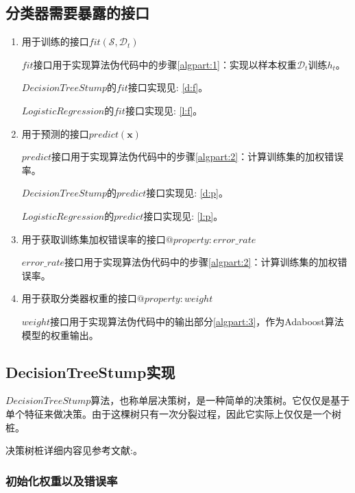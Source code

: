 \documentclass{paper}
\begin{document}
\subsection{分类器需要暴露的接口}

\begin{enumerate}
    \item 用于训练的接口$fit(\mathcal{S},\mathcal{D}_t)$
            
            $fit$接口用于实现算法伪代码中的步骤\ref{algpart:1}：实现以样本权重$\mathcal{D}_t$训练$h_t$。

            $DecisionTreeStump$的$fit$接口实现见: \ref{d:f}。

            $LogisticRegression$的$fit$接口实现见: \ref{l:f}。
    
    \item 用于预测的接口$predict(\mathbf{x})$
    
            $predict$接口用于实现算法伪代码中的步骤\ref{algpart:2}：计算训练集的加权错误率。

            $DecisionTreeStump$的$predict$接口实现见: \ref{d:p}。

            $LogisticRegression$的$predict$接口实现见: \ref{l:p}。
    
    \item 用于获取训练集加权错误率的接口$@property:error\_rate$
    
            $error\_rate$接口用于实现算法伪代码中的步骤\ref{algpart:2}：计算训练集的加权错误率。

    \item 用于获取分类器权重的接口$@property:weight$
            
            $weight$接口用于实现算法伪代码中的输出部分\ref{algpart:3}，作为Adaboost算法模型的权重输出。
\end{enumerate}

\subsection{DecisionTreeStump实现}

$DecisionTreeStump$算法，也称单层决策树，是一种简单的决策树。它仅仅是基于单个特征来做决策。由于这棵树只有一次分裂过程，因此它实际上仅仅是一个树桩。

决策树桩详细内容见参考文献:\cite{ref2}。

\subsubsection{初始化权重以及错误率}
\end{document}
